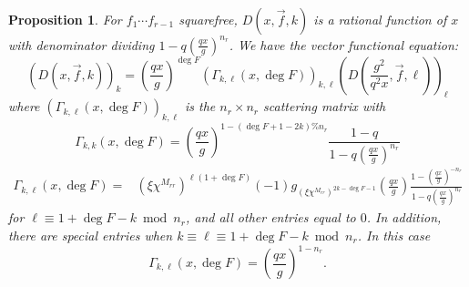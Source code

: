 \documentclass[11pt,letterpaper]{article}
\newtheorem{prop}[theorem]{Proposition}
\theoremstyle{definition}
\theoremstyle{remark}
\numberwithin{equation}{section}
\theoremstyle{dotless}
\begin{document}
\begin{prop} \label{PropGlobalFE}
For $f_1\cdots f_{r-1}$ squarefree, $D(x, \vec{f}, k)$ is a rational function of $x$ with denominator dividing $1-q\left(\frac{q x}{g}\right)^{n_r}$. We have the vector functional equation:
\begin{equation} \label{GlobalFE}
\left( D(x, \vec{f}, k) \right)_k = \left(\frac{qx}{g}\right)^{\deg F} \left( \Gamma_{k, \ell}(x, \deg F) \right)_{k, \ell} \left( D\left(\frac{g^2}{q^2x}, \vec{f}, \ell\right) \right)_{\ell}
\end{equation}
where $\left( \Gamma_{k, \ell}(x, \deg F) \right)_{k, \ell}$ is the $n_r \times n_r$ scattering matrix with
\begin{equation*}
\Gamma_{k,k}(x, \deg F) = \left(\frac{qx}{g}\right)^{1 - (\deg F +1-2k)\% n_r} \frac{1-q}{1-q\left(\frac{q x}{g}\right)^{n_r}}
\end{equation*}
\begin{equation*}
\begin{split}
\Gamma_{k,\ell}(x, \deg F)=&(\xi \chi^{M_{rr}})^{\ell(1+\deg F)}(-1) g_{(\xi \chi^{M_{rr}})^{2k-\deg F -1}} \left(\frac{qx}{g}\right) \frac{1-\left(\frac{qx}{g}\right)^{-n_r}}{1-q\left(\frac{qx}{g}\right)^{n_r}} 
\end{split}
\end{equation*}
for $\ell \equiv 1+\deg F -k \bmod n_r$, and all other entries equal to $0$. In addition, there are special entries when $k \equiv \ell \equiv 1+\deg F -k \bmod n_r$. In this case 
\begin{equation*}
\Gamma_{k,\ell}(x, \deg F)=\left(\frac{qx}{g}\right)^{1-n_r}.
\end{equation*}
\end{prop}
\end{document}
